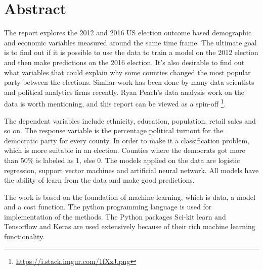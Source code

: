 \section*{Abstract}
\setlength{\parindent}{0cm}
The report explores the 2012 and 2016 US election outcome based demographic and economic variables measured around the same time frame. The ultimate goal is to find out if it is possible to use the data to train a model on the 2012 election and then make predictions on the 2016 election. It’s also desirable to find out what variables that could explain why some counties changed the most popular party between the elections. Similar work has been done by many data scientists and political analytics firms recently. Ryan Peach’s data analysis work on the data is worth mentioning, and this report can be viewed as a spin-off \footnote{\url{https://i.stack.imgur.com/1fXzJ.png}}. 
\\
\par 

The dependent variables include ethnicity, education, population, retail sales and so on. The response variable is the percentage political turnout for the democratic party for every county. In order to make it a classification problem, which is more suitable in an election. Counties where the democrats got more than 50\% is labeled as 1, else 0.  
The models applied on the data are logistic regression, support vector machines and artificial neural network. All models have the ability of learn from the data and make good predictions.
\\
\par 

The work is based on the foundation of machine learning, which is data, a model and a cost function. The python programming language is used for implementation of the methods. The Python packages Sci-kit learn and Tensorflow and Keras are used extensively because of their rich machine learning functionality.